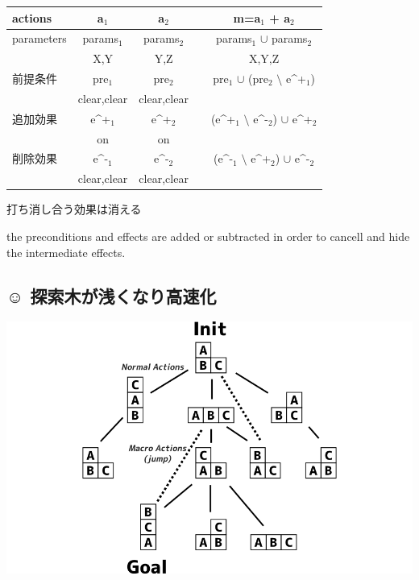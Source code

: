 \begin{center}
\begin{center}
\begin{tabular}{l|cc|l|c|}
actions & a$_{\text{1}}$ & a$_{\text{2}}$ &  & m=a$_{\text{1}}$ + a$_{\text{2}}$\\
\hline
parameters & params$_{\text{1}}$ & params$_{\text{2}}$ &  & params$_{\text{1}}$ $\cup$ params$_{\text{2}}$\\
 & X,Y & Y,Z &  & X,Y,Z\\
前提条件 & pre$_{\text{1}}$ & pre$_{\text{2}}$ &  & pre$_{\text{1}}$ $\cup$ (pre$_{\text{2}}$ $\setminus$ e\^{}+$_{\text{1}}$)\\
 & clear,clear & clear,clear &  & \\
追加効果 & e\^{}+$_{\text{1}}$ & e\^{}+$_{\text{2}}$ &  & (e\^{}+$_{\text{1}}$ $\setminus$ e\^{}-$_{\text{2}}$) $\cup$ e\^{}+$_{\text{2}}$\\
 & on & on &  & \\
削除効果 & e\^{}-$_{\text{1}}$ & e\^{}-$_{\text{2}}$ &  & (e\^{}-$_{\text{1}}$ $\setminus$ e\^{}+$_{\text{2}}$) $\cup$ e\^{}-$_{\text{2}}$\\
 & clear,clear & clear,clear &  & \\
\end{tabular}
\end{center}
\end{center}

\begin{alignright}
打ち消し合う効果は消える
\end{alignright}

\begin{resume}
the preconditions and effects are added or subtracted
in order to cancell and hide the intermediate effects.
\end{resume}

\subsection{☺ 探索木が浅くなり高速化}
\label{sec-6-4}

\includegraphics{img/macro2/search.0.png}

